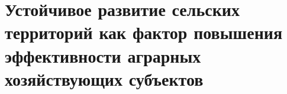 \section{Устойчивое развитие сельских территорий как фактор повышения эффективности аграрных хозяйствующих субъектов}
